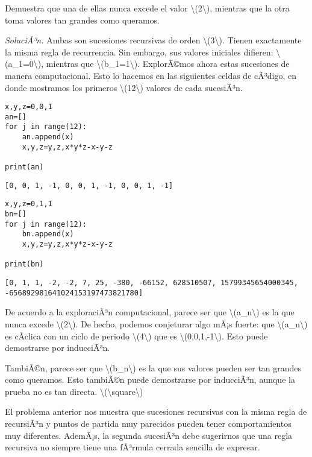 Demuestra que una de ellas nunca excede el valor
{\textbackslash(2\textbackslash)}, mientras que la otra toma valores tan
grandes como queramos.

\emph{SoluciÃ³n.} Ambas son sucesiones recursivas de orden
{\textbackslash(3\textbackslash)}. Tienen exactamente la misma regla de
recurrencia. Sin embargo, sus valores iniciales difieren:
{\textbackslash(a\_1=0\textbackslash)}, mientras que
{\textbackslash(b\_1=1\textbackslash)}. ExplorÃ©mos ahora estas
sucesiones de manera computacional. Esto lo hacemos en las siguientes
celdas de cÃ³digo, en donde mostramos los primeros
{\textbackslash(12\textbackslash)} valores de cada sucesiÃ³n.

\begin{verbatim}
x,y,z=0,0,1
an=[]
for j in range(12):
    an.append(x)
    x,y,z=y,z,x*y*z-x-y-z

print(an)
\end{verbatim}

\begin{verbatim}
[0, 0, 1, -1, 0, 0, 1, -1, 0, 0, 1, -1]
\end{verbatim}

\begin{verbatim}
x,y,z=0,1,1
bn=[]
for j in range(12):
    bn.append(x)
    x,y,z=y,z,x*y*z-x-y-z

print(bn)
\end{verbatim}

\begin{verbatim}
[0, 1, 1, -2, -2, 7, 25, -380, -66152, 628510507, 15799345654000345, -656892981641024153197473821780]
\end{verbatim}

De acuerdo a la exploraciÃ³n computacional, parece ser que
{\textbackslash(a\_n\textbackslash)} es la que nunca excede
{\textbackslash(2\textbackslash)}. De hecho, podemos conjeturar algo
mÃ¡s fuerte: que {\textbackslash(a\_n\textbackslash)} es cÃ­clica con un
ciclo de periodo {\textbackslash(4\textbackslash)} que es
{\textbackslash(0,0,1,-1\textbackslash)}. Esto puede demostrarse por
inducciÃ³n.

TambiÃ©n, parece ser que {\textbackslash(b\_n\textbackslash)} es la que
sus valores pueden ser tan grandes como queramos. Esto tambiÃ©n puede
demostrarse por inducciÃ³n, aunque la prueba no es tan directa.
{{\textbackslash(\textbackslash square\textbackslash)}}

El problema anterior nos muestra que sucesiones recursivas con la misma
regla de recursiÃ³n y puntos de partida muy parecidos pueden tener
comportamientos muy diferentes. AdemÃ¡s, la segunda sucesiÃ³n debe
sugerirnos que una regla recursiva no siempre tiene una fÃ³rmula cerrada
sencilla de expresar.

